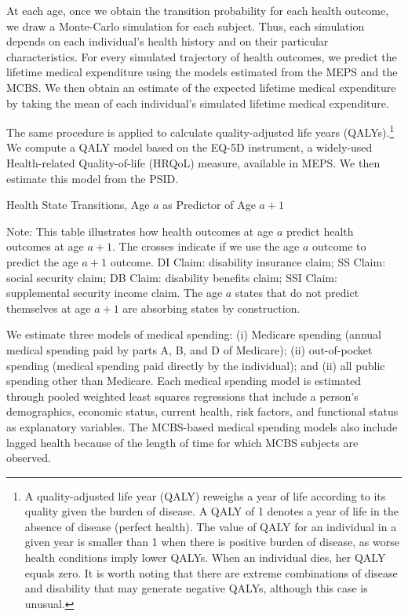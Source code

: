 At each age, once we obtain the transition probability for each health outcome, we draw a Monte-Carlo simulation for each subject. Thus, each simulation depends on each individual's health history and on their particular characteristics. For every simulated trajectory of health outcomes, we predict the lifetime medical expenditure using the models estimated from the MEPS and the MCBS. We then obtain an estimate of the expected lifetime medical expenditure by taking the mean of each individual's simulated lifetime medical expenditure.

The same procedure is applied to calculate quality-adjusted life years (QALYs).\footnote{A quality-adjusted life year (QALY) reweighs a year of life according to its quality given the burden of disease. A QALY of 1 denotes a year of life in the absence of disease (perfect health). The value of QALY for an individual in a given year is smaller than 1 when there is positive burden of disease, as worse health conditions imply lower QALYs. When an individual dies, her QALY equals zero. It is worth noting that there are extreme combinations of disease and disability that may generate negative QALYs, although this case is unusual.} We compute a QALY model based on the EQ-5D instrument, a widely-used Health-related Quality-of-life (HRQoL) measure, available in MEPS. We then estimate this model from the PSID.

\begin{table}
\begin{threeparttable}
\caption{Health State Transitions, Age $a$ as Predictor of Age $a+1$}\label{table:transition}
\scriptsize

\begin{tablenotes}
\footnotesize
\item Note: This table illustrates how health outcomes at age $a$ predict health outcomes at age $a+1$. The crosses indicate if we use the age $a$ outcome to predict the age $a+1$ outcome. DI Claim: disability insurance claim; SS Claim: social security claim; DB Claim: disability benefits claim; SSI Claim: supplemental security income claim. The age $a$ states that do not predict themselves at age $a+1$ are absorbing states by construction.
\end{tablenotes}
\end{threeparttable}
\end{table}

We estimate three models of medical spending: (i) Medicare spending (annual medical spending paid by parts A, B, and D of Medicare); (ii) out-of-pocket spending (medical spending paid directly by the individual); and (ii) all public spending other than Medicare. Each medical spending model is estimated through pooled weighted least squares regressions that include a person's demographics, economic status, current health, risk factors, and functional status as explanatory variables. The MCBS-based medical spending models also include lagged health because of the length of time for which MCBS subjects are observed.


